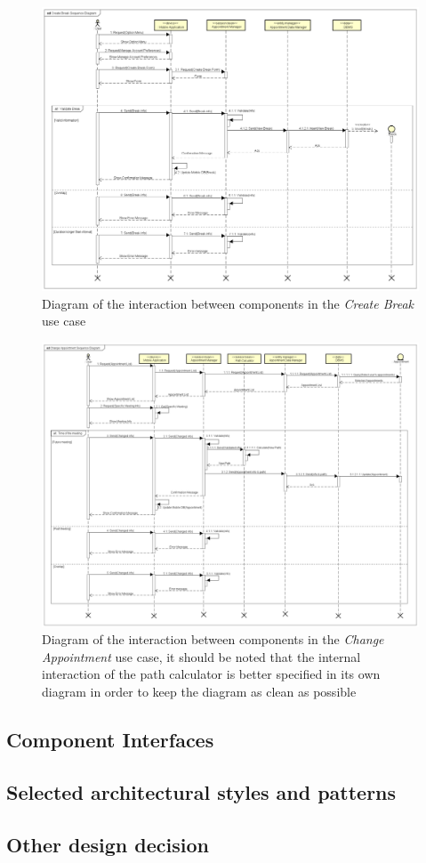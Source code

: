 \begin{figure}[h]
\centering
\includegraphics[width = \textwidth, keepaspectratio = true, angle=90]{Img/CreateBreakSequence}
\caption{Diagram of the interaction between components in the \emph{Create Break} use case}
\label{fig:CreateBreakSequence}
\end{figure}

\begin{figure}[h]
\centering
\includegraphics[width = \textwidth, keepaspectratio = true, angle=90]{Img/ChangeAppointmentSequence}
\caption{Diagram of the interaction between components in the \emph{Change Appointment} use case, it should be noted that the internal interaction of the path calculator is better specified in its own diagram in order to keep the diagram as clean as possible}
\label{fig:ChangeAppointmentSequence}
\end{figure}

\clearpage
\subsection{Component Interfaces}

\clearpage
\subsection{Selected architectural styles and patterns}

\clearpage
\subsection{Other design decision}